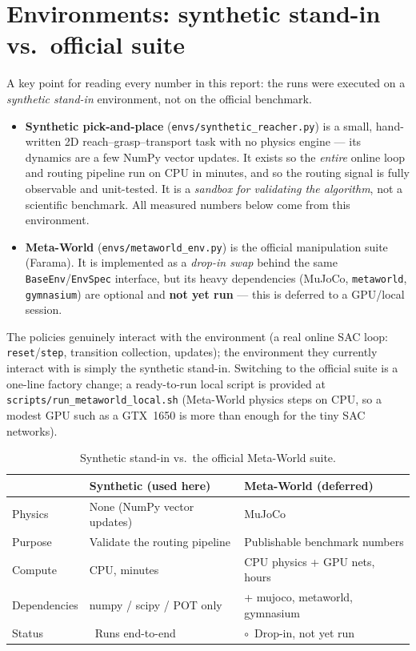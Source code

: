 \documentclass[11pt]{article}
\newcommand{\yes}{\textcolor{green!55!black}{\checkmark}}
\newcommand{\wip}{\textcolor{orange!85!black}{$\circ$}}
\newcommand{\code}[1]{\texttt{#1}}
\begin{document}
\section{Environments: synthetic stand-in vs.\ official suite}
\label{sec:envs}
A key point for reading every number in this report: the runs were executed on a
\emph{synthetic stand-in} environment, not on the official benchmark.

\begin{itemize}\itemsep2pt
  \item \textbf{Synthetic pick-and-place} (\code{envs/synthetic\_reacher.py}) is a
        small, hand-written 2D reach--grasp--transport task with no physics
        engine --- its dynamics are a few NumPy vector updates. It exists so the
        \emph{entire} online loop and routing pipeline run on CPU in minutes, and
        so the routing signal is fully observable and unit-tested. It is a
        \emph{sandbox for validating the algorithm}, not a scientific benchmark.
        All measured numbers below come from this environment.
  \item \textbf{Meta-World} (\code{envs/metaworld\_env.py}) is the official
        manipulation suite (Farama). It is implemented as a \emph{drop-in swap}
        behind the same \code{BaseEnv}/\code{EnvSpec} interface, but its heavy
        dependencies (MuJoCo, \code{metaworld}, \code{gymnasium}) are optional and
        \textbf{not yet run} --- this is deferred to a GPU/local session.
\end{itemize}

\noindent The policies genuinely interact with the environment (a real online SAC
loop: \code{reset}/\code{step}, transition collection, updates); the environment
they currently interact with is simply the synthetic stand-in. Switching to the
official suite is a one-line factory change; a ready-to-run local script is
provided at \code{scripts/run\_metaworld\_local.sh}
(Meta-World physics steps on CPU, so a modest GPU such as a GTX~1650 is more than
enough for the tiny SAC networks).

\begin{table}[h]
\centering
\caption{Synthetic stand-in vs.\ the official Meta-World suite.}
\label{tab:envs}
\small
\begin{tabular}{L{3.4cm} L{5.1cm} L{5.1cm}}
\toprule
 & \textbf{Synthetic (used here)} & \textbf{Meta-World (deferred)} \\
\midrule
Physics        & None (NumPy vector updates) & MuJoCo \\
Purpose        & Validate the routing pipeline & Publishable benchmark numbers \\
Compute        & CPU, minutes & CPU physics + GPU nets, hours \\
Dependencies   & numpy / scipy / POT only & + mujoco, metaworld, gymnasium \\
Status         & \yes~Runs end-to-end & \wip~Drop-in, not yet run \\
\bottomrule
\end{tabular}
\end{table}
\end{document}
